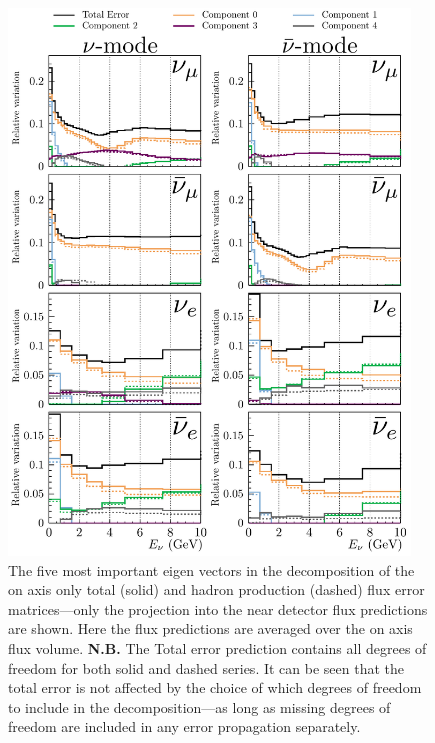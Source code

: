 \documentclass{article}
\begin{document}
\begin{figure}
  \centering
  \includegraphics[width=0.95\textwidth]{plots/EvUncerts_allpca_ppfxcomp}
  \caption{The five most important eigen vectors in the decomposition of the on axis only total (solid) and hadron production (dashed) flux error matrices---only the projection into the near detector flux predictions are shown. Here the flux predictions are averaged over the on axis flux volume. \textbf{N.B.} The Total error prediction contains all degrees of freedom for both solid and dashed series. It can be seen that the total error is not affected by the choice of which degrees of freedom to include in the decomposition---as long as missing degrees of freedom are included in any error propagation separately.}
  \label{fig:evfreedom_onaxis_pppfxcomp}
\end{figure}
\end{document}

